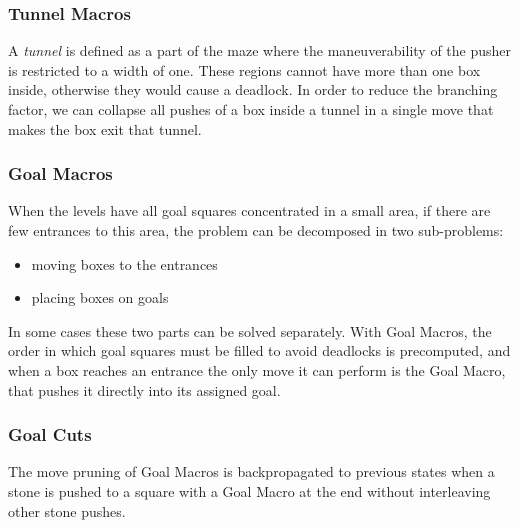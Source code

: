 \subsubsection*{Tunnel Macros}
A \textit{tunnel} is defined as a part of the maze where the maneuverability of the pusher is restricted to a width of one. These regions cannot have more than one box inside, otherwise they would cause a deadlock. In order to reduce the branching factor, we can collapse all pushes of a box inside a tunnel in a single move that makes the box exit that tunnel.

\subsubsection*{Goal Macros}
When the levels have all goal squares concentrated in a small area, if there are few entrances to this area, the problem can be decomposed in two sub-problems:
\begin{itemize}
    \item moving boxes to the entrances 
    \item placing boxes on goals
\end{itemize}
In some cases these two parts can be solved separately. With Goal Macros, the order in which goal squares must be filled to avoid deadlocks is precomputed, and when a box reaches an entrance the only move it can perform is the Goal Macro, that pushes it directly into its assigned goal.

\subsubsection*{Goal Cuts}
The move pruning of Goal Macros is backpropagated to previous states when a stone is pushed to a square with a Goal Macro at the end without interleaving other stone pushes.

